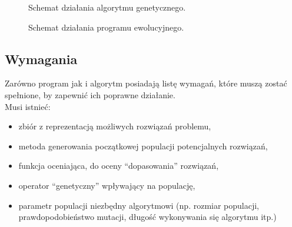 \documentclass[twoside,a4paper,10]{book}
\begin{document}
\begin{figure}[!h]
		\centering
		\caption{Schemat działania algorytmu genetycznego.}
		\label{fig:roznice_alg}
		\caption{Schemat działania programu ewolucyjnego.}
		\label{fig:roznice_prog}
\end{figure}
\subsection{Wymagania}
Zarówno program jak i algorytm posiadają listę wymagań, które muszą zostać spełnione, by zapewnić ich poprawne działanie.~\cite{algBook}\\
Musi istnieć:
~\begin{itemize}
\item
zbiór z reprezentacją możliwych rozwiązań problemu,
\item
metoda generowania początkowej populacji potencjalnych rozwiązań, 
\item
funkcja oceniająca, do oceny \enquote{dopasowania} rozwiązań,
\item
operator \enquote{genetyczny} wpływający na populację,
\item
parametr populacji niezbędny algorytmowi (np. rozmiar populacji, prawdopodobieństwo mutacji, długość wykonywania się algorytmu itp.) 

\end{itemize}
\end{document}
